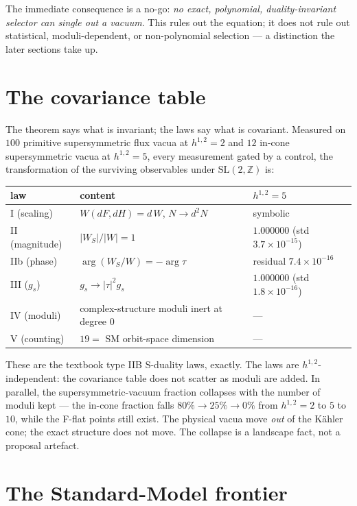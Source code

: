 \documentclass[11pt]{article}
\newcommand{\flux}{F}
\newcommand{\hh}{H}
\begin{document}
The immediate consequence is a no-go: \emph{no exact, polynomial, duality-invariant selector can
single out a vacuum}. This rules out the equation; it does not rule out statistical,
moduli-dependent, or non-polynomial selection --- a distinction the later sections take up.

\section{The covariance table}

The theorem says what is invariant; the laws say what is covariant. Measured on $100$ primitive
supersymmetric flux vacua at $h^{1,2}=2$ and $12$ in-cone supersymmetric vacua at $h^{1,2}=5$,
every measurement gated by a control, the transformation of the surviving observables under
$\mathrm{SL}(2,\mathbb{Z})$ is:

\begin{center}
\begin{tabular}{lll}
\toprule
law & content & $h^{1,2}=5$ \\
\midrule
I (scaling) & $W(d\flux,d\hh)=d\,W$, $N\to d^2N$ & symbolic \\
II (magnitude) & $|W_S|/|W|=1$ & $1.000000$ (std $3.7\times10^{-15}$) \\
IIb (phase) & $\arg(W_S/W)=-\arg\tau$ & residual $7.4\times10^{-16}$ \\
III ($g_s$) & $g_s\to|\tau|^2 g_s$ & $1.000000$ (std $1.8\times10^{-16}$) \\
IV (moduli) & complex-structure moduli inert at degree $0$ & --- \\
V (counting) & $19=$ SM orbit-space dimension & --- \\
\bottomrule
\end{tabular}
\end{center}

These are the textbook type IIB S-duality laws, exactly. The laws are $h^{1,2}$-independent: the
covariance table does not scatter as moduli are added. In parallel, the supersymmetric-vacuum
fraction collapses with the number of moduli kept --- the in-cone fraction falls $80\%\to
25\%\to 0\%$ from $h^{1,2}=2$ to $5$ to $10$, while the F-flat points still exist. The physical
vacua move \emph{out} of the K\"ahler cone; the exact structure does not move. The collapse is a
landscape fact, not a proposal artefact.

\section{The Standard-Model frontier}
\end{document}
